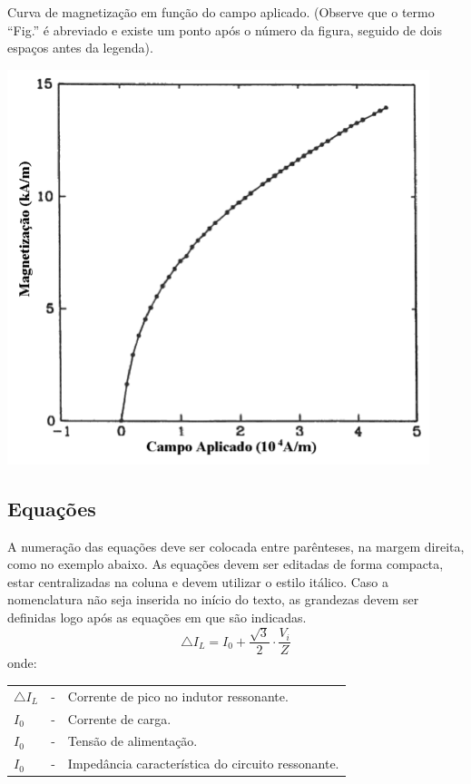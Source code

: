 \documentclass{ceel}
\begin{document}
\begin{multicols}{2}
\begin{minipage}[h]{\columnwidth}
\centering
\begin{footnotesize}
\captionsetup{type=figure}
\caption{Curva de magnetização em função do campo aplicado. (Observe que o termo “Fig.” é abreviado e existe um ponto após o número da figura, seguido de dois espaços antes da legenda).}
\includegraphics[scale=1]{figura}
\label{fig1}
\end{footnotesize}
\end{minipage}

\subsection{Equações}
A numeração das equações deve ser colocada entre parênteses, na margem direita, como no exemplo abaixo. As equações devem ser editadas de forma compacta, estar centralizadas na coluna e devem utilizar o estilo itálico. Caso a nomenclatura não seja inserida no início do texto, as grandezas devem ser definidas logo após as equações em que são indicadas.
\begin{equation}
\bigtriangleup I_L=I_0+\frac{\sqrt{3}}{2}\cdot\frac{V_i}{Z}
\end{equation}
onde:\\

\begin{tabular}{lrl}
$\bigtriangleup I_L$ &-&Corrente de pico no indutor ressonante.\\
$I_0$&-&Corrente de carga.\\
$I_0$&-&Tensão de alimentação.\\
$I_0$&-&Impedância característica do circuito ressonante.
\end{tabular}


\end{multicols}
\end{document}
